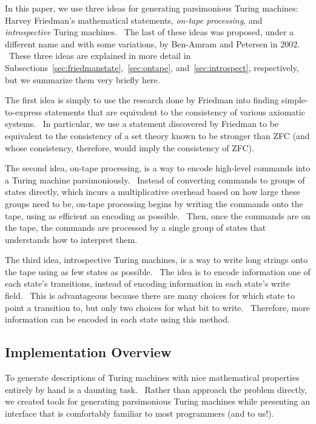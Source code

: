 \documentclass[11pt]{article}
\begin{document}
In this paper, we use three ideas for generating parsimonious Turing machines: Harvey Friedman's mathematical statements, \emph{on-tape processing}, and \emph{introspective} Turing machines. \ The last of these ideas was proposed, under a different name and with some variations, by Ben-Amram and Petersen in 2002.~\cite{benamram} \ These three ideas are explained in more detail in Subsections~\ref{sec:friedmanstate},~\ref{sec:ontape}, and~\ref{sec:introspect}, respectively, but we summarize them very briefly here.

The first idea is simply to use the research done by Friedman into finding simple-to-express statements that are equivalent to the consistency of various axiomatic systems. \ In particular, we use a statement discovered by Friedman to be equivalent to the consistency of a set theory known to be stronger than ZFC (and whose consistency, therefore, would imply the consistency of ZFC).~\cite{friedman}

The second idea, on-tape processing, is a way to encode high-level commands into a Turing machine parsimoniously. \ Instead of converting commands to groups of states directly, which incurs a multiplicative overhead based on how large these groups need to be, on-tape processing begins by writing the commands onto the tape, using as efficient an encoding as possible. \ Then, once the commands are on the tape, the commands are processed by a single group of states that understands how to interpret them.

The third idea, introspective Turing machines, is a way to write long strings onto the tape using as few states as possible. \ The idea is to encode information one of each state's transitions, instead of encoding information in each state's write field. \ This is advantageous because there are many choices for which state to point a transition to, but only two choices for what bit to write. \ Therefore, more information can be encoded in each state using this method.

\subsection{Implementation Overview}

To generate descriptions of Turing machines with nice mathematical properties entirely by hand is a daunting task. \ Rather than approach the problem directly, we created tools for generating parsimonious Turing machines while presenting an interface that is comfortably familiar to most programmers (and to us!).
\end{document}
